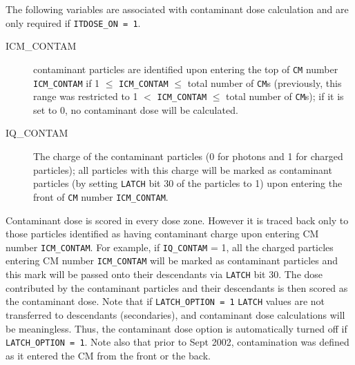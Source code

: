 \documentclass[12pt,twoside]{article}
\begin{document}

The following variables are associated with contaminant dose calculation
and are only required if  \verb+ITDOSE_ON = 1+.
\begin{description}
\item [ICM\_CONTAM] contaminant particles are identified upon entering
the top of \verb+CM+ number \verb+ICM_CONTAM+ if 1 $\leq$ \verb+ICM_CONTAM+
$\leq$ total number of \verb+CM+s (previously, this range was restricted to
1 $<$ \verb+ICM_CONTAM+ $\leq$ total number of \verb+CM+s);
if it is set to 0, no contaminant dose will be calculated.
\item [IQ\_CONTAM] The charge of the contaminant particles (0 for photons
and 1 for charged particles); all particles
with this charge will be marked as contaminant particles (by setting
\verb+LATCH+ bit  30 of the particles to 1)
upon entering the front of \verb+CM+ number \verb+ICM_CONTAM+.
\end{description}
Contaminant dose is scored in every dose zone.  However it is traced back only
to those particles identified as having contaminant charge upon entering CM
number \verb+ICM_CONTAM+. For example, if \verb+IQ_CONTAM+ = 1, all the charged
particles entering CM number \verb+ICM_CONTAM+ will be marked as contaminant
particles and this mark will be passed onto their descendants via
\verb+LATCH+ bit 30. The dose
contributed by the contaminant particles and their descendants is then scored
as the contaminant dose.  Note that if \verb+LATCH_OPTION = 1+
\verb+LATCH+ values are not transferred to descendants (secondaries),
and contaminant dose calculations will be
meaningless.  Thus, the contaminant dose option is automatically
turned off if \verb+LATCH_OPTION = 1+. Note also that prior to Sept 2002,
contamination was defined as it entered the CM from the front or the back.
\end{document}
